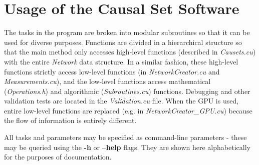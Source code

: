 \documentclass[preprint,notitlepage,amsmath,amssymb,floatfix]{revtex4-1}
\begin{document}

\appendix
\appendixpage
\addappheadtotoc

\section{Usage of the Causal Set Software}
The tasks in the program are broken into modular subroutines so that it can be used for diverse purposes.
Functions are divided in a hierarchical structure so that the main method only accesses high-level functions (described in \textit{Causets.cu}) with the entire \textit{Network} data structure.
In a similar fashion, these high-level functions strictly access low-level functions (in \textit{NetworkCreator.cu} and \textit{Measurements.cu}), and the low-level functions access mathematical (\textit{Operations.h}) and algorithmic (\textit{Subroutines.cu}) functions.
Debugging and other validation tests are located in the \textit{Validation.cu} file.
When the GPU is used, entire low-level functions are replaced (e.g. in \textit{NetworkCreator\_GPU.cu}) because the flow of information is entirely different. \par
All tasks and parameters may be specified as command-line parameters - these may be queried using the \textbf{-h} or \textbf{--help} flags.
They are shown here alphabetically for the purposes of documentation.
\end{document}
